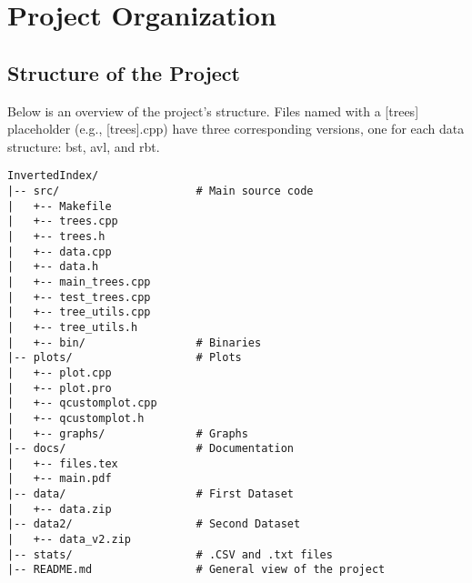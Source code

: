 \section{Project Organization}

\subsection{Structure of the Project}
Below is an overview of the project's structure. Files named with a [trees] placeholder (e.g., [trees].cpp) have three corresponding versions, one for each data structure: bst, avl, and rbt.


\begin{verbatim}
InvertedIndex/
|-- src/                     # Main source code
|   +-- Makefile          
|   +-- trees.cpp          
|   +-- trees.h 
|   +-- data.cpp
|   +-- data.h 
|   +-- main_trees.cpp 
|   +-- test_trees.cpp  
|   +-- tree_utils.cpp 
|   +-- tree_utils.h 
|   +-- bin/                 # Binaries
|-- plots/                   # Plots
|   +-- plot.cpp
|   +-- plot.pro
|   +-- qcustomplot.cpp
|   +-- qcustomplot.h
|   +-- graphs/              # Graphs
|-- docs/                    # Documentation
|   +-- files.tex
|   +-- main.pdf
|-- data/                    # First Dataset
|   +-- data.zip
|-- data2/                   # Second Dataset
|   +-- data_v2.zip                        
|-- stats/                   # .CSV and .txt files 
|-- README.md                # General view of the project
\end{verbatim}